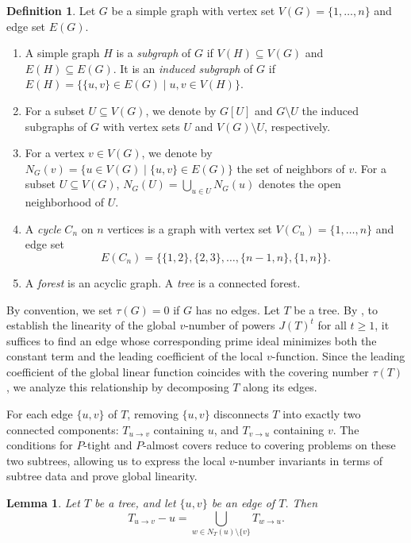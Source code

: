\documentclass[12pt,amscd]{amsart}
\newtheorem{lem}[thm]{Lemma}
\theoremstyle{definition}
\newtheorem{defn}[thm]{Definition}
\numberwithin{equation}{section}
\begin{document}
\begin{defn}\label{definition1}
Let $G$ be a simple graph with vertex set $V(G) = \{1, \ldots, n\}$ and edge set $E(G)$.
\begin{enumerate}
    \item A simple graph $H$ is a \emph{subgraph} of $G$ if $V(H) \subseteq V(G)$ and $E(H) \subseteq E(G)$. It is an \emph{induced subgraph} of $G$ if $E(H) = \{ \{u, v\} \in E(G) \mid u, v \in V(H) \}$.
    
    \item For a subset $U \subseteq V(G)$, we denote by $G[U]$ and $G \setminus U$ the induced subgraphs of $G$ with vertex sets $U$ and $V(G) \setminus U$, respectively.
    
    \item For a vertex $v \in V(G)$, we denote by $N_G(v) = \{u \in V(G) \mid \{u, v\} \in E(G)\}$ the set of neighbors of $v$. For a subset $U \subseteq V(G)$, $N_G(U) = \bigcup_{u \in U} N_G(u)$ denotes the open neighborhood of $U$.
    
    \item A \emph{cycle} $C_n$ on $n$ vertices is a graph with vertex set $V(C_n) = \{1, \ldots, n\}$ and edge set
    \[
    E(C_n) = \{ \{1,2\}, \{2,3\}, \ldots, \{n-1,n\}, \{1,n\} \}.
    \]
    
    \item A \emph{forest} is an acyclic graph. A \emph{tree} is a connected forest.
\end{enumerate}
\end{defn}
By convention, we set $\tau(G) = 0$ if $G$ has no edges. Let $T$ be a tree. By \cite[Theorem 1.3]{V}, to establish the linearity of the global $v$-number of powers $J(T)^t$ for all $t \ge 1$, it suffices to find an edge whose corresponding prime ideal minimizes both the constant term and the leading coefficient of the local $v$-function. Since the leading coefficient of the global linear function coincides with the covering number $\tau(T)$, we analyze this relationship by decomposing $T$ along its edges.

For each edge $\{u,v\}$ of $T$, removing $\{u,v\}$ disconnects $T$ into exactly two connected components: $T_{u \to v}$ containing $u$, and $T_{v \to u}$ containing $v$. The conditions for $P$-tight and $P$-almost covers reduce to covering problems on these two subtrees, allowing us to express the local $v$-number invariants in terms of subtree data and prove global linearity.

\begin{lem}\label{lem:2}
Let $T$ be a tree, and let $\{u,v\}$ be an edge of $T$. Then
\[
T_{u\to v}-u
=
\bigcup_{w\in N_T(u)\setminus\{v\}} T_{w\to u}.
\]
\end{lem}
\end{document}
